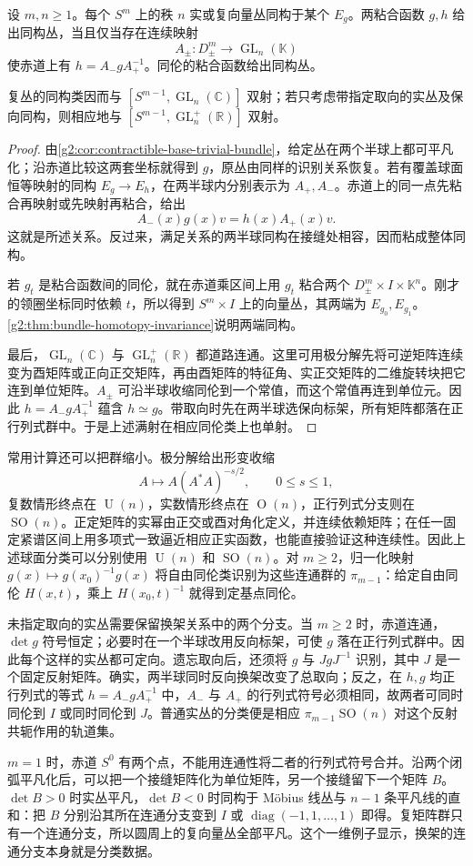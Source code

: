 \begin{theorem}\label{g2:thm:clutching-classification}
	设 \(m,n\ge1\)。每个 \(S^m\) 上的秩 \(n\) 实或复向量丛同构于某个 \(E_g\)。两粘合函数 \(g,h\) 给出同构丛，当且仅当存在连续映射
	\[
		A_\pm:D_\pm^m\longrightarrow\operatorname{GL}_n(\mathbb K)
	\]
	使赤道上有 \(h=A_-gA_+^{-1}\)。同伦的粘合函数给出同构丛。

	复丛的同构类因而与 \([S^{m-1},\operatorname{GL}_n(\mathbb C)]\) 双射；若只考虑带指定取向的实丛及保向同构，则相应地与 \([S^{m-1},\operatorname{GL}_n^+(\mathbb R)]\) 双射。
\end{theorem}
\begin{proof}
	由\cref{g2:cor:contractible-base-trivial-bundle}，给定丛在两个半球上都可平凡化；沿赤道比较这两套坐标就得到 \(g\)，原丛由同样的识别关系恢复。若有覆盖球面恒等映射的同构 \(E_g\to E_h\)，在两半球内分别表示为 \(A_+,A_-\)。赤道上的同一点先粘合再映射或先映射再粘合，给出
	\[
		A_-(x)g(x)v=h(x)A_+(x)v.
	\]
	这就是所述关系。反过来，满足关系的两半球同构在接缝处相容，因而粘成整体同构。

	若 \(g_t\) 是粘合函数间的同伦，就在赤道乘区间上用 \(g_t\) 粘合两个 \(D_\pm^m\times I\times\mathbb K^n\)。刚才的领圈坐标同时依赖 \(t\)，所以得到 \(S^m\times I\) 上的向量丛，其两端为 \(E_{g_0},E_{g_1}\)。\cref{g2:thm:bundle-homotopy-invariance}说明两端同构。

	最后，\(\operatorname{GL}_n(\mathbb C)\) 与 \(\operatorname{GL}_n^+(\mathbb R)\) 都道路连通。这里可用极分解先将可逆矩阵连续变为酉矩阵或正向正交矩阵，再由酉矩阵的特征角、实正交矩阵的二维旋转块把它连到单位矩阵。\(A_\pm\) 可沿半球收缩同伦到一个常值，而这个常值再连到单位元。因此 \(h=A_-gA_+^{-1}\) 蕴含 \(h\simeq g\)。带取向时先在两半球选保向标架，所有矩阵都落在正行列式群中。于是上述满射在相应同伦类上也单射。
\end{proof}

常用计算还可以把群缩小。极分解给出形变收缩
\[
	A\longmapsto A(A^*A)^{-s/2},\qquad 0\le s\le1,
\]
复数情形终点在 \(\operatorname U(n)\)，实数情形终点在 \(\operatorname O(n)\)，正行列式分支则在 \(\operatorname{SO}(n)\)。正定矩阵的实幂由正交或酉对角化定义，并连续依赖矩阵；在任一固定紧谱区间上用多项式一致逼近相应正实函数，也能直接验证这种连续性。因此上述球面分类可以分别使用 \(\operatorname U(n)\) 和 \(\operatorname{SO}(n)\)。对 \(m\ge2\)，归一化映射 \(g(x)\mapsto g(x_0)^{-1}g(x)\) 将自由同伦类识别为这些连通群的 \(\pi_{m-1}\)：给定自由同伦 \(H(x,t)\)，乘上 \(H(x_0,t)^{-1}\) 就得到定基点同伦。

\ProseParagraphBreak

未指定取向的实丛需要保留换架关系中的两个分支。当 \(m\ge2\) 时，赤道连通，\(\det g\) 符号恒定；必要时在一个半球改用反向标架，可使 \(g\) 落在正行列式群中。因此每个这样的实丛都可定向。遗忘取向后，还须将 \(g\) 与 \(JgJ^{-1}\) 识别，其中 \(J\) 是一个固定反射矩阵。确实，两半球同时反向换架改变了总取向；反之，在 \(h,g\) 均正行列式的等式 \(h=A_-gA_+^{-1}\) 中，\(A_-\) 与 \(A_+\) 的行列式符号必须相同，故两者可同时同伦到 \(I\) 或同时同伦到 \(J\)。普通实丛的分类便是相应 \(\pi_{m-1}\operatorname{SO}(n)\) 对这个反射共轭作用的轨道集。

\ProseParagraphBreak

\(m=1\) 时，赤道 \(S^0\) 有两个点，不能用连通性将二者的行列式符号合并。沿两个闭弧平凡化后，可以把一个接缝矩阵化为单位矩阵，另一个接缝留下一个矩阵 \(B\)。\(\det B>0\) 时实丛平凡，\(\det B<0\) 时同构于 Möbius 线丛与 \(n-1\) 条平凡线的直和：把 \(B\) 分别沿其所在连通分支变到 \(I\) 或 \(\operatorname{diag}(-1,1,\ldots,1)\) 即得。复矩阵群只有一个连通分支，所以圆周上的复向量丛全部平凡。这个一维例子显示，换架的连通分支本身就是分类数据。
